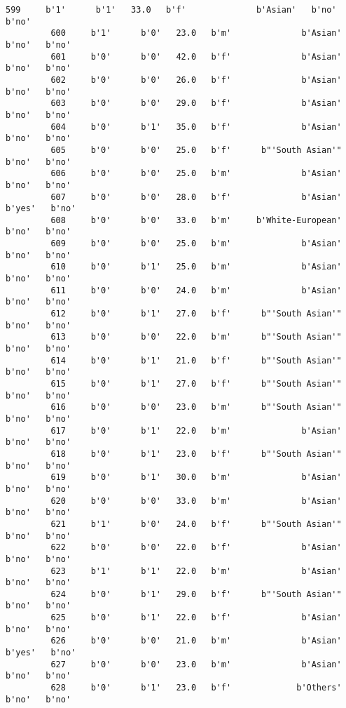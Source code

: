 \documentclass[11pt]{article}
\begin{document}
\begin{Verbatim}[commandchars=\\\{\}]
         599     b'1'      b'1'   33.0   b'f'              b'Asian'   b'no'   b'no'   
         600     b'1'      b'0'   23.0   b'm'              b'Asian'   b'no'   b'no'   
         601     b'0'      b'0'   42.0   b'f'              b'Asian'   b'no'   b'no'   
         602     b'0'      b'0'   26.0   b'f'              b'Asian'   b'no'   b'no'   
         603     b'0'      b'0'   29.0   b'f'              b'Asian'   b'no'   b'no'   
         604     b'0'      b'1'   35.0   b'f'              b'Asian'   b'no'   b'no'   
         605     b'0'      b'0'   25.0   b'f'      b"'South Asian'"   b'no'   b'no'   
         606     b'0'      b'0'   25.0   b'm'              b'Asian'   b'no'   b'no'   
         607     b'0'      b'0'   28.0   b'f'              b'Asian'  b'yes'   b'no'   
         608     b'0'      b'0'   33.0   b'm'     b'White-European'   b'no'   b'no'   
         609     b'0'      b'0'   25.0   b'm'              b'Asian'   b'no'   b'no'   
         610     b'0'      b'1'   25.0   b'm'              b'Asian'   b'no'   b'no'   
         611     b'0'      b'0'   24.0   b'm'              b'Asian'   b'no'   b'no'   
         612     b'0'      b'1'   27.0   b'f'      b"'South Asian'"   b'no'   b'no'   
         613     b'0'      b'0'   22.0   b'm'      b"'South Asian'"   b'no'   b'no'   
         614     b'0'      b'1'   21.0   b'f'      b"'South Asian'"   b'no'   b'no'   
         615     b'0'      b'1'   27.0   b'f'      b"'South Asian'"   b'no'   b'no'   
         616     b'0'      b'0'   23.0   b'm'      b"'South Asian'"   b'no'   b'no'   
         617     b'0'      b'1'   22.0   b'm'              b'Asian'   b'no'   b'no'   
         618     b'0'      b'1'   23.0   b'f'      b"'South Asian'"   b'no'   b'no'   
         619     b'0'      b'1'   30.0   b'm'              b'Asian'   b'no'   b'no'   
         620     b'0'      b'0'   33.0   b'm'              b'Asian'   b'no'   b'no'   
         621     b'1'      b'0'   24.0   b'f'      b"'South Asian'"   b'no'   b'no'   
         622     b'0'      b'0'   22.0   b'f'              b'Asian'   b'no'   b'no'   
         623     b'1'      b'1'   22.0   b'm'              b'Asian'   b'no'   b'no'   
         624     b'0'      b'1'   29.0   b'f'      b"'South Asian'"   b'no'   b'no'   
         625     b'0'      b'1'   22.0   b'f'              b'Asian'   b'no'   b'no'   
         626     b'0'      b'0'   21.0   b'm'              b'Asian'  b'yes'   b'no'   
         627     b'0'      b'0'   23.0   b'm'              b'Asian'   b'no'   b'no'   
         628     b'0'      b'1'   23.0   b'f'             b'Others'   b'no'   b'no'   

\end{Verbatim}
\end{document}
